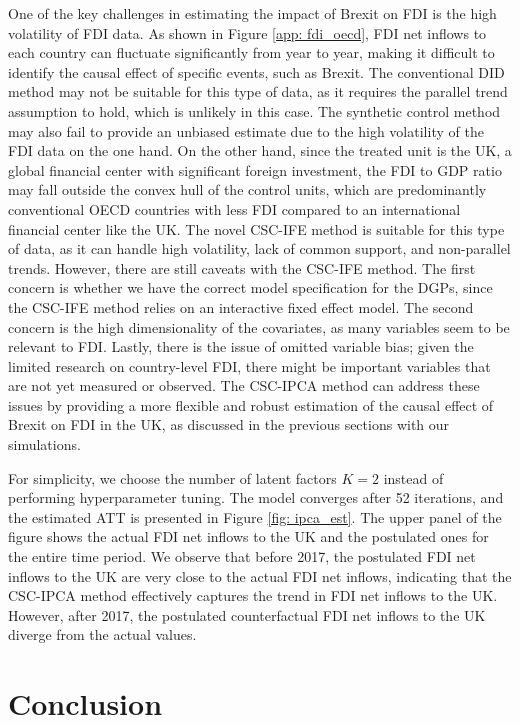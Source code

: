 \documentclass[12pt]{article}
\begin{document}
One of the key challenges in estimating the impact of Brexit on FDI is the high volatility of FDI data. As shown in Figure \ref{app: fdi_oecd}, FDI net inflows to each country can fluctuate significantly from year to year, making it difficult to identify the causal effect of specific events, such as Brexit. The conventional DID method may not be suitable for this type of data, as it requires the parallel trend assumption to hold, which is unlikely in this case. The synthetic control method may also fail to provide an unbiased estimate due to the high volatility of the FDI data on the one hand. On the other hand, since the treated unit is the UK, a global financial center with significant foreign investment, the FDI to GDP ratio may fall outside the convex hull of the control units, which are predominantly conventional OECD countries with less FDI compared to an international financial center like the UK. The novel CSC-IFE method is suitable for this type of data, as it can handle high volatility, lack of common support, and non-parallel trends. However, there are still caveats with the CSC-IFE method. The first concern is whether we have the correct model specification for the DGPs, since the CSC-IFE method relies on an interactive fixed effect model. The second concern is the high dimensionality of the covariates, as many variables seem to be relevant to FDI. Lastly, there is the issue of omitted variable bias; given the limited research on country-level FDI, there might be important variables that are not yet measured or observed. The CSC-IPCA method can address these issues by providing a more flexible and robust estimation of the causal effect of Brexit on FDI in the UK, as discussed in the previous sections with our simulations.

For simplicity, we choose the number of latent factors $K = 2$ instead of performing hyperparameter tuning. The model converges after 52 iterations, and the estimated ATT is presented in Figure \ref{fig: ipca_est}. The upper panel of the figure shows the actual FDI net inflows to the UK and the postulated ones for the entire time period. We observe that before 2017, the postulated FDI net inflows to the UK are very close to the actual FDI net inflows, indicating that the CSC-IPCA method effectively captures the trend in FDI net inflows to the UK. However, after 2017, the postulated counterfactual FDI net inflows to the UK diverge from the actual values. 
\section{Conclusion} 
\label{sec: conclusion}
\end{document}
